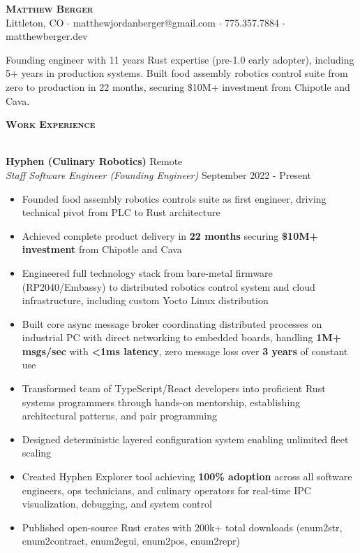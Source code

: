\documentclass[a4paper]{article}
\newcommand{\lineunder} {
    \vspace*{-8pt} \\
    \hspace*{-18pt} \hrulefill \\
}
\newcommand{\header} [1] {
    {\hspace*{-18pt}\vspace*{6pt} \large \textbf{\textsc{#1}}}
    \vspace*{-6pt} \lineunder
    \vspace*{4pt}
}
\begin{document}
\vspace*{-40pt}

\begin{center}
    {\Huge \scshape \textbf{Matthew Berger}}\\
    \vspace*{4pt}
    Littleton, CO $\cdot$ matthewjordanberger@gmail.com $\cdot$ 775.357.7884 $\cdot$ matthewberger.dev\\
\end{center}

\vspace*{-6pt}
Founding engineer with 11 years Rust expertise (pre-1.0 early adopter), including 5+ years in production systems. Built food assembly robotics control suite from zero to production in 22 months, securing \$10M+ investment from Chipotle and Cava.
\vspace*{8pt}

\header{Work Experience}

\textbf{Hyphen (Culinary Robotics)} \hfill Remote\\
\textit{Staff Software Engineer (Founding Engineer)} \hfill September 2022 - Present\\
\vspace{-1mm}
\begin{itemize} \itemsep 1pt
    \item Founded food assembly robotics controls suite as first engineer, driving technical pivot from PLC to Rust architecture
    \item Achieved complete product delivery in \textbf{22 months} securing \textbf{\$10M+ investment} from Chipotle and Cava
    \item Engineered full technology stack from bare-metal firmware (RP2040/Embassy) to distributed robotics control system and cloud infrastructure, including custom Yocto Linux distribution
    \item Built core async message broker coordinating distributed processes on industrial PC with direct networking to embedded boards, handling \textbf{1M+ msgs/sec} with \textbf{<1ms latency}, zero message loss over \textbf{3 years} of constant use
    \item Transformed team of TypeScript/React developers into proficient Rust systems programmers through hands-on mentorship, establishing architectural patterns, and pair programming
    \item Designed deterministic layered configuration system enabling unlimited fleet scaling
    \item Created Hyphen Explorer tool achieving \textbf{100\% adoption} across all software engineers, ops technicians, and culinary operators for real-time IPC visualization, debugging, and system control
    \item Published open-source Rust crates with 200k+ total downloads (enum2str, enum2contract, enum2egui, enum2pos, enum2repr)
\end{itemize}
\end{document}
